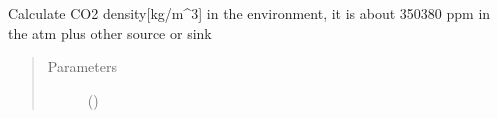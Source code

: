 \documentclass[letterpaper,10pt,english]{sphinxmanual}
\begin{document}
\begin{fulllineitems}
\label{\detokenize{carbonation:carbonation.C_S}}
\sphinxAtStartPar
Calculate CO2 density{[}kg/m\textasciicircum{}3{]} in the environment, it is about 350\sphinxhyphen{}380 ppm in the atm plus other source or sink
\begin{quote}\begin{description}
\item[{Parameters}] \leavevmode
\sphinxAtStartPar
{} (\sphinxstyleliteralemphasis{\sphinxupquote{, }}\sphinxstyleliteralemphasis{\sphinxupquote{(}}\sphinxstyleliteralemphasis{\sphinxupquote{)}}\sphinxstyleliteralemphasis{\sphinxupquote{, }}) \textendash{} 

\end{description}\end{quote}

\end{fulllineitems}

\end{document}
